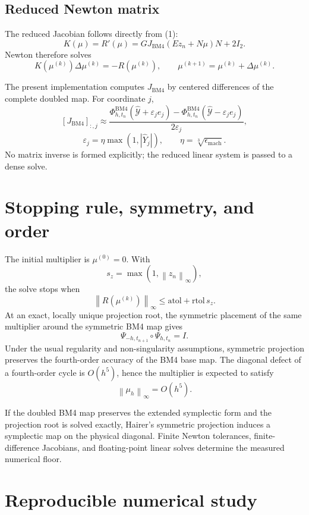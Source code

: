 \documentclass[11pt,a4paper]{article}
\newcommand{\Id}{I}
\newcommand{\Y}{\mathcal{Y}}
\newcommand{\PhiBM}{\Phi^{\mathrm{BM4}}_{h,t_n}}
\newcommand{\norm}[1]{\left\lVert #1\right\rVert}
\begin{document}
\subsection*{Reduced Newton matrix}

The reduced Jacobian follows directly from (1):
\[
 \boxed{
 K(\mu)=R'(\mu)
 =GJ_{\mathrm{BM4}}(Ez_n+N\mu)N+2\Id_2.
 } \tag{3}
\]
Newton therefore solves
\[
 K(\mu^{(k)})\Delta\mu^{(k)}=-R(\mu^{(k)}),
 \qquad
 \mu^{(k+1)}=\mu^{(k)}+\Delta\mu^{(k)}.
\]

The present implementation computes $J_{\mathrm{BM4}}$ by centered differences
of the complete doubled map.  For coordinate $j$,
\[
 [J_{\mathrm{BM4}}]_{:,j}
 \approx
 \frac{\PhiBM(\widehat{\Y}+\varepsilon_je_j)
       -\PhiBM(\widehat{\Y}-\varepsilon_je_j)}{2\varepsilon_j},
\]
\[
 \varepsilon_j
 =\eta\max(1,|\widehat{Y}_j|),
 \qquad
 \eta=\sqrt[3]{\epsilon_{\mathrm{mach}}}.
\]
No matrix inverse is formed explicitly; the reduced linear system is passed to
a dense solve.

\section{Stopping rule, symmetry, and order}

The initial multiplier is $\mu^{(0)}=0$.  With
\[
 s_z=\max(1,\norm{z_n}_\infty),
\]
the solve stops when
\[
 \norm{R(\mu^{(k)})}_\infty
 \leq \mathrm{atol}+\mathrm{rtol}\,s_z.
\]
At an exact, locally unique projection root, the symmetric placement of the same
multiplier around the symmetric BM4 map gives
\[
 \Psi_{-h,t_{n+1}}\circ\Psi_{h,t_n}=\Id.
\]
Under the usual regularity and non-singularity assumptions, symmetric projection
preserves the fourth-order accuracy of the BM4 base map.  The diagonal defect of
a fourth-order cycle is $O(h^5)$, hence the multiplier is expected to satisfy
\[
 \boxed{\norm{\mu_h}_\infty=O(h^5).}
\]

If the doubled BM4 map preserves the extended symplectic form and the projection
root is solved exactly, Hairer's symmetric projection induces a symplectic map on
the physical diagonal.  Finite Newton tolerances, finite-difference Jacobians,
and floating-point linear solves determine the measured numerical floor.

\section{Reproducible numerical study}
\end{document}

